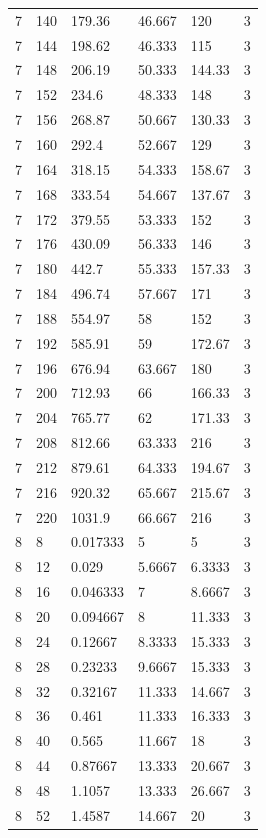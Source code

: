 \begin{tabular}{|p{0.6cm}|p{0.5cm}|p{1.15cm}|p{1cm}|p{1cm}|p{0.7cm}|}
7 & 140 & 179.36 & 46.667 & 120 & 3 \\
7 & 144 & 198.62 & 46.333 & 115 & 3 \\
7 & 148 & 206.19 & 50.333 & 144.33 & 3 \\
7 & 152 & 234.6 & 48.333 & 148 & 3 \\
7 & 156 & 268.87 & 50.667 & 130.33 & 3 \\
7 & 160 & 292.4 & 52.667 & 129 & 3 \\
7 & 164 & 318.15 & 54.333 & 158.67 & 3 \\
7 & 168 & 333.54 & 54.667 & 137.67 & 3 \\
7 & 172 & 379.55 & 53.333 & 152 & 3 \\
7 & 176 & 430.09 & 56.333 & 146 & 3 \\
7 & 180 & 442.7 & 55.333 & 157.33 & 3 \\
7 & 184 & 496.74 & 57.667 & 171 & 3 \\
7 & 188 & 554.97 & 58 & 152 & 3 \\
7 & 192 & 585.91 & 59 & 172.67 & 3 \\
7 & 196 & 676.94 & 63.667 & 180 & 3 \\
7 & 200 & 712.93 & 66 & 166.33 & 3 \\
7 & 204 & 765.77 & 62 & 171.33 & 3 \\
7 & 208 & 812.66 & 63.333 & 216 & 3 \\
7 & 212 & 879.61 & 64.333 & 194.67 & 3 \\
7 & 216 & 920.32 & 65.667 & 215.67 & 3 \\
7 & 220 & 1031.9 & 66.667 & 216 & 3 \\
8 & 8 & 0.017333 & 5 & 5 & 3 \\
8 & 12 & 0.029 & 5.6667 & 6.3333 & 3 \\
8 & 16 & 0.046333 & 7 & 8.6667 & 3 \\
8 & 20 & 0.094667 & 8 & 11.333 & 3 \\
8 & 24 & 0.12667 & 8.3333 & 15.333 & 3 \\
8 & 28 & 0.23233 & 9.6667 & 15.333 & 3 \\
8 & 32 & 0.32167 & 11.333 & 14.667 & 3 \\
8 & 36 & 0.461 & 11.333 & 16.333 & 3 \\
8 & 40 & 0.565 & 11.667 & 18 & 3 \\
8 & 44 & 0.87667 & 13.333 & 20.667 & 3 \\
8 & 48 & 1.1057 & 13.333 & 26.667 & 3 \\
8 & 52 & 1.4587 & 14.667 & 20 & 3 \\

\end{tabular}
